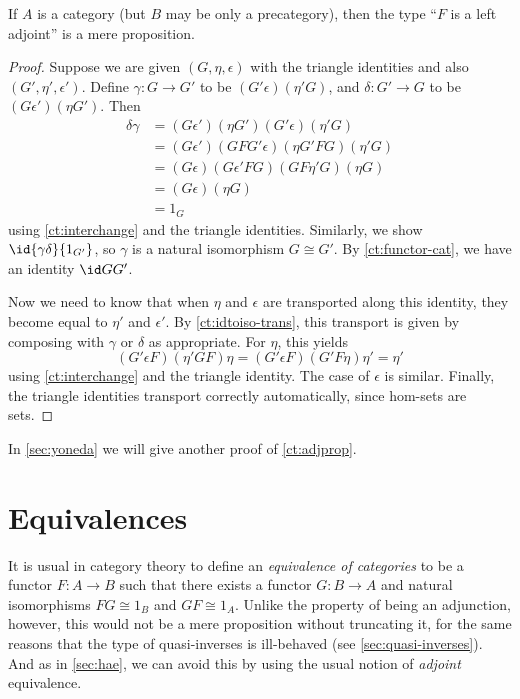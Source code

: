 \begin{lem}\label{ct:adjprop}
  If $A$ is a category (but $B$ may be only a precategory), then the type ``$F$ is a left adjoint'' is a mere proposition.
\end{lem}
\begin{proof}
  Suppose we are given $(G,\eta,\epsilon)$ with the triangle identities and also $(G',\eta',\epsilon')$.
  Define $\gamma:G\to G'$ to be $(G'\epsilon)(\eta' G)$, and $\delta:G'\to G$ to be $(G\epsilon')(\eta G')$.
  Then
  \begin{align*}
    \delta\gamma &=
    (G\epsilon')(\eta G')(G'\epsilon)(\eta'G)\\
    &= (G\epsilon')(G F G'\epsilon)(\eta G' F G)(\eta'G)\\
    &= (G\epsilon)(G\epsilon'FG)(G F \eta' G)(\eta G)\\
    &= (G\epsilon)(\eta G)\\
    &= 1_G
  \end{align*}
  using \cref{ct:interchange} and the triangle identities.
  Similarly, we show $\id{\gamma\delta}{1_{G'}}$, so $\gamma$ is a natural isomorphism $G\cong G'$.
  By \cref{ct:functor-cat}, we have an identity $\id G {G'}$.

  Now we need to know that when $\eta$ and $\epsilon$ are transported along this identity, they become equal to $\eta'$ and $\epsilon'$.
  By \cref{ct:idtoiso-trans}, this transport is given by composing with $\gamma$ or $\delta$ as appropriate.
  For $\eta$, this yields
  \begin{equation*}
    (G'\epsilon F)(\eta'GF)\eta
    = (G'\epsilon F)(G'F\eta)\eta'
    = \eta'
  \end{equation*}
  using \cref{ct:interchange} and the triangle identity.
  The case of $\epsilon$ is similar.
  Finally, the triangle identities transport correctly automatically, since hom-sets are sets.
\end{proof}

In \cref{sec:yoneda} we will give another proof of \cref{ct:adjprop}.


\section{Equivalences}
\label{sec:equivalences}

It is usual in category theory to define an \emph{equivalence of categories} to be a functor $F:A\to B$ such that there exists a functor $G:B\to A$ and natural isomorphisms $F G \cong 1_B$ and $G F \cong 1_A$.
Unlike the property of being an adjunction, however, this would not be a mere proposition without truncating it, for the same reasons that the type of quasi-inverses is ill-behaved (see \cref{sec:quasi-inverses}).
And as in \cref{sec:hae}, we can avoid this by using the usual notion of \emph{adjoint} equivalence.


